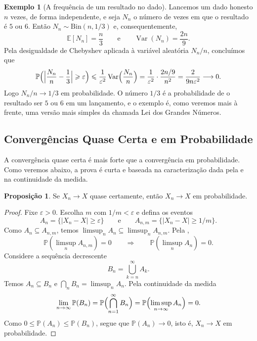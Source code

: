 \documentclass[12pt,portuguese]{article}
\theoremstyle{definition}
\newtheorem{example}[example]{Exemplo}
\newtheorem{proposition}[proposition]{Proposição}
\theoremstyle{plainexercise}
\theoremstyle{starredexercise}
\theoremstyle{definition}
\begin{document}
\begin{example}[A frequência de um resultado no dado]\label{ex:prob-binomial}
Lancemos um dado honesto $n$ vezes, de forma independente, e seja $N_n$ o
número de vezes em que o resultado é $5$ ou $6$. Então
$N_n\sim\mathrm{Bin}(n,1/3)$ e, consequentemente,
\[
\mathbb{E}[N_n]=\frac{n}{3}
\qquad\text{e}\qquad
\operatorname{Var}(N_n)=\frac{2n}{9}.
\]
Pela desigualdade de
Chebyshev aplicada à variável aleatória $N_n/n$, concluímos que
\[
\mathbb{P}\Bigl(\Bigl|\frac{N_n}{n}-\frac{1}{3}\Bigr|\geqslant\varepsilon\Bigr)
\leqslant
\frac{1}{\varepsilon^2}\operatorname{Var}\Bigl(\frac{N_n}{n}\Bigr)
=
\frac{1}{\varepsilon^2}\cdot\frac{2n/9}{n^2}
=
\frac{2}{9n\varepsilon^2}\longrightarrow0.
\]
Logo $N_n/n\to1/3$ em probabilidade. O número $1/3$ é a probabilidade de o
resultado ser $5$ ou $6$ em um lançamento, e o exemplo é, como veremos mais à
frente, uma versão mais simples da chamada Lei dos Grandes Números.
\end{example}

\subsection{Convergências Quase Certa e em Probabilidade}
\label{subsec:qc-implies-prob}

A convergência quase certa é mais forte que a convergência em probabilidade.
Como veremos abaixo, a prova é curta e baseada na caracterização dada pela
 e na continuidade da medida.

\begin{proposition}\label{prop:qc-implies-prob}
Se $X_n\to X$ quase certamente, então $X_n\to X$ em probabilidade.
\end{proposition}

\begin{proof}
Fixe $\varepsilon>0$. Escolha $m$ com $1/m<\varepsilon$ e defina os eventos
\[
A_n=\{|X_n-X|\geqslant\varepsilon\}
\qquad\text{e}\qquad
A_{n,m}=\{|X_n-X|\geqslant1/m\}.
\]
Como $A_n\subseteq A_{n,m}$, temos
$\limsup_n A_n\subseteq\limsup_n A_{n,m}$. Pela
,
\[
\mathbb{P}(\limsup_n A_{n,m})=0
\qquad\Longrightarrow\qquad
\mathbb{P}(\limsup_n A_n)=0.
\]
Considere a
sequência decrescente
\[
B_n=\bigcup_{k=n}^{\infty}A_k.
\]
Temos $A_n\subseteq B_n$ e $\bigcap_n B_n=\limsup_n A_n$. Pela continuidade da
medida 
\[
\lim_{n\to\infty}\mathbb{P}(B_n)
=
\mathbb{P}\Bigl(\bigcap_{n=1}^{\infty}B_n\Bigr)
=
\mathbb{P}\Bigl(\limsup_{n\to\infty}A_n\Bigr)=0.
\]
Como $0\leqslant\mathbb{P}(A_n)\leqslant\mathbb{P}(B_n)$, segue que
$\mathbb{P}(A_n)\to0$, isto é, $X_n\to X$ em probabilidade.
\end{proof}
\end{document}
